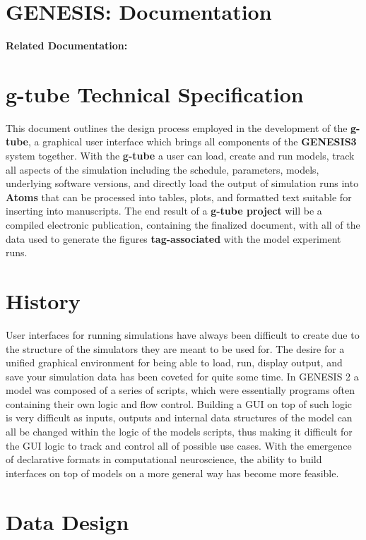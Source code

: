 \documentclass[12pt]{article}
\begin{document}
\section*{GENESIS: Documentation}

{\bf Related Documentation:}

\section*{g-tube Technical Specification}

	This document outlines the design process employed in the development of the {\bf g-tube}, a graphical user interface which brings all components of the {\bf GENESIS3} system together. With the {\bf g-tube} a user can load, create and run models, track all aspects of the simulation including the schedule, parameters, models, underlying software versions, and directly load the output of simulation runs into {\bf Atoms} that can be processed into tables, plots, and formatted text suitable for inserting into manuscripts. The end result of a {\bf g-tube project} will be a compiled electronic publication, containing the finalized document, with all of the data used to generate the figures {\bf tag-associated}  with the model experiment runs. 

\section*{History}

	User interfaces for running simulations have always been difficult to create due to the structure of the simulators they are meant to be used for. The desire for a unified graphical environment for being able to load, run, display output, and save your simulation data has been coveted for quite some time. In GENESIS 2 a model was composed of a series of scripts, which were essentially programs often containing their own logic and flow control. Building a GUI on top of such logic is very difficult as inputs, outputs and internal data structures of the model can all be changed within the logic of the models scripts, thus making it difficult for the GUI logic to track and control all of possible use cases. With the emergence of declarative formats in computational neuroscience, the ability to build interfaces on top of models on a more general way has become more feasible.

\section*{Data Design}
\end{document}
